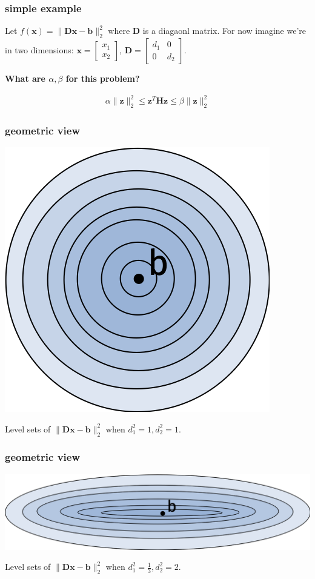 \documentclass[compress]{beamer}
\newcommand{\bv}[1]{\mathbf{#1}}
\begin{document}
\begin{frame}[t]
	\frametitle{simple example}
	Let $f(\bv{x}) = \|\bv{D}\bv{x} - \bv{b}\|_2^2$ where $\bv{D}$ is a diagaonl matrix. For now imagine we're in two dimensions: $\bv{x} = \begin{bmatrix}
		x_1\\
		x_2
	\end{bmatrix}$, $\bv{D} = \begin{bmatrix}
		d_1 & 0 \\
		0 & d_2
	\end{bmatrix}
	$.
	\begin{center}
		\textbf{What are $\alpha,\beta$ for this problem?}
	\end{center}
	\begin{align*}
		\alpha\|\bv{z}\|_2^2 \leq \bv{z}^T\bv{H}\bv{z} \leq \beta\|\bv{z}\|_2^2
	\end{align*}
\end{frame}

\begin{frame}[t]
	\frametitle{geometric view}
	\begin{center}
		\includegraphics[width=.5\textwidth]{perfect_conditioning.png}
		
		Level sets of $\|\bv{D}\bv{x} - \bv{b}\|_2^2$ when $d_1^2 = 1, d_2^2 = 1$. 
	\end{center}
\end{frame}

\begin{frame}[t]
	\frametitle{geometric view}
	\begin{center}
		\includegraphics[width=\textwidth]{poor_conditioning.png}
		
		Level sets of $\|\bv{D}\bv{x} - \bv{b}\|_2^2$ when $d_1^2 = \frac{1}{3}, d_2^2 = 2$. 
	\end{center}
\end{frame}
\end{document}
